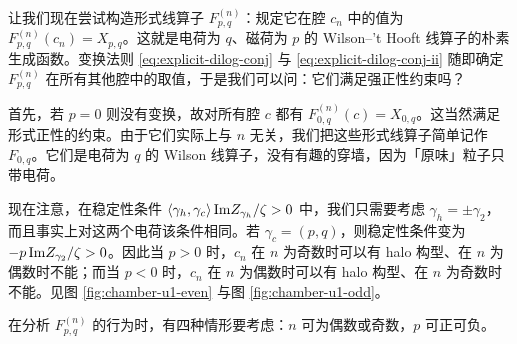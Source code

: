 让我们现在尝试构造形式线算子 $F^{(n)}_{p,q}$：规定它在腔 $c_n$ 中的值为 $F^{(n)}_{p,q}(c_n) = X_{p,q}$。这就是电荷为 $q$、磁荷为 $p$ 的 Wilson--'t Hooft 线算子的朴素生成函数。变换法则 \eqref{eq:explicit-dilog-conj} 与 \eqref{eq:explicit-dilog-conj-ii} 随即确定 $F^{(n)}_{p,q}$ 在所有其他腔中的取值，于是我们可以问：它们满足强正性约束吗？

首先，若 $p=0$ 则没有变换，故对所有腔 $c$ 都有 $F^{(n)}_{0,q}(c)=X_{0,q}$。这当然满足形式正性的约束。由于它们实际上与 $n$ 无关，我们把这些形式线算子简单记作 $F_{0,q}$。它们是电荷为 $q$ 的 Wilson 线算子，没有有趣的穿墙，因为「原味」粒子只带电荷。

现在注意，在稳定性条件 $\langle\gamma_h,\gamma_c\rangle\,{\rm Im}Z_{\gamma_h}/\zeta > 0$ 中，我们只需要考虑 $\gamma_h=\pm\gamma_2$，而且事实上对这两个电荷该条件相同。若 $\gamma_c=(p,q)$，则稳定性条件变为 $-p\,{\rm Im}Z_{\gamma_2}/\zeta>0$。因此当 $p>0$ 时，$c_n$ 在 $n$ 为奇数时可以有 halo 构型、在 $n$ 为偶数时不能；而当 $p<0$ 时，$c_n$ 在 $n$ 为偶数时可以有 halo 构型、在 $n$ 为奇数时不能。见图 \ref{fig:chamber-u1-even} 与图 \ref{fig:chamber-u1-odd}。


在分析 $F^{(n)}_{p,q}$ 的行为时，有四种情形要考虑：$n$ 可为偶数或奇数，$p$ 可正可负。

